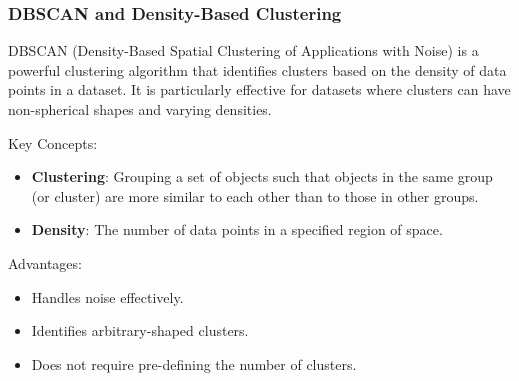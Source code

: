 \documentclass[aspectratio=169]{beamer}
\begin{document}
\begin{frame}[fragile]
    \frametitle{DBSCAN and Density-Based Clustering}
    DBSCAN (Density-Based Spatial Clustering of Applications with Noise) is a powerful clustering algorithm that identifies clusters based on the density of data points in a dataset. It is particularly effective for datasets where clusters can have non-spherical shapes and varying densities.
    
    \begin{block}{Key Concepts:}
        \begin{itemize}
            \item \textbf{Clustering}: Grouping a set of objects such that objects in the same group (or cluster) are more similar to each other than to those in other groups.
            \item \textbf{Density}: The number of data points in a specified region of space.
        \end{itemize}
    \end{block}
    
    \begin{block}{Advantages:}
        \begin{itemize}
            \item Handles noise effectively.
            \item Identifies arbitrary-shaped clusters.
            \item Does not require pre-defining the number of clusters.
        \end{itemize}
    \end{block}
\end{frame}
\end{document}
